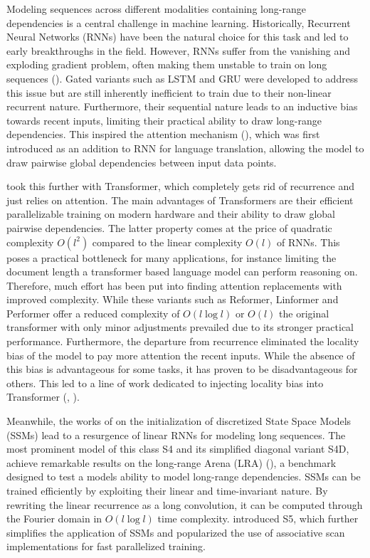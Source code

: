 \documentclass{article} \usepackage{iclr2024_conference,times}
\begin{document}
Modeling sequences across different modalities containing long-range dependencies is a central challenge in machine learning. Historically, Recurrent Neural Networks (RNNs) have been the natural choice for this task and led to early breakthroughs in the field. However, RNNs suffer from the vanishing and exploding gradient problem, often making them unstable to train on long sequences (\cite{hochreiter1997lstm}). Gated variants such as LSTM and GRU were developed to address this issue but are still inherently inefficient to train due to their non-linear recurrent nature. Furthermore, their sequential nature  leads to an inductive bias towards recent inputs, limiting their practical ability to draw long-range dependencies. This inspired the attention mechanism (\cite{garg2019jointly}), which was first introduced as an addition to RNN for language translation, allowing the model to draw pairwise global dependencies between input data points. 

\cite{vaswani2023attention} took this further with Transformer, which completely gets rid of recurrence and just relies on attention. The main advantages of Transformers are their efficient parallelizable training on modern hardware and their ability to draw global pairwise dependencies. The latter property comes at the price of quadratic complexity $O(l^2)$ compared to the linear complexity $O(l)$ of RNNs. This poses a practical bottleneck for many applications, for instance limiting the document length a transformer based language model can perform reasoning on. Therefore, much effort has been put into finding attention replacements with improved complexity. While these variants such as Reformer, Linformer and Performer offer a reduced complexity of $O(l \log l)$ or $O(l)$ the original transformer with only minor adjustments prevailed due to its stronger practical performance.
Furthermore, the departure from recurrence eliminated the locality bias of the model to pay more attention the recent inputs. While the absence of this bias is advantageous for some tasks, it has proven to be disadvantageous for others. This led to a line of work dedicated to injecting locality bias into Transformer (\cite{ma2023mega}, \cite{huang2023encoding}). 

Meanwhile, the works of \cite{gu2022efficiently} on the initialization of discretized State Space Models (SSMs) lead to a resurgence of linear RNNs for modeling long sequences. The most prominent model of this class S4 and its simplified diagonal variant S4D, achieve remarkable results on the long-range Arena (LRA) (\cite{tay2020long}), a benchmark designed to test a models ability to model long-range dependencies. SSMs can be trained efficiently by exploiting their linear and time-invariant nature. By rewriting the linear recurrence as a long convolution, it can be computed through the Fourier domain in $O(l \log l)$ time complexity. \cite{smith2023simplified} introduced S5, which further simplifies the application of SSMs and popularized the use of associative scan implementations for fast parallelized training.
\end{document}
